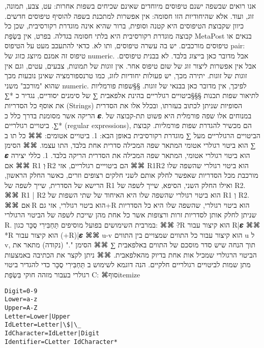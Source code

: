       אנו רואים שבשפה ישנם טיפוסים מיוחדים שאינם שכיחים בשפות אחרות: עט, צבע,
      תמונה, זוג, ועוד. אלא שהיחודיות הזו חסומה: אין אפשרות למתכנת בשפה להוסיף
      טיפוסים חדשים. כיוון שקבוצת הטיפוסים היא קטנה וסופית, ברור שהיא אינה
      מוגדרת רקורסיבית, שכן כל קבוצה מוגדרת רקורסיבית היא בלתי חסומה בגדלה.
      בפרט, אין בִּשְׂפַת MetaPost בנאים או טיפוסים מורכבים. יש בה עשרה טיפוסים, ותו
      לא. כדאי להתעכב מעט על הטיפוס pair: טיפוס זה אמנם מיוצג כזוג של numeric.
      אבל מדובר כאן בייצוג בלבד. לא בבנית טיפוסים. אבל אין אפשרות ליצור זוג של
      שום טיפוס אחר. אין זוגות של תמונות, צבעים, עטים, וגם אין זוגות של זוגות.
      יתירה מכך, יש פעולות יחודיות לזוג, כמו טרנספורמציה שאינן נובעות מכך שהוא
      "מורכב" משני numeric. לפיכך, אין מדובר כאן בבנאי של זוגות.
      §§שפות פורמליות לתיאור שפות תכנות
      §§§ביטויים רגולריים
      בהינת אלפאבית ∑ של סימנים יסודיים, נגדיר כ *∑ את אוסף כל הסדריות (Strings) הסופיות שניתן לכתוב בעזרתו, ובכלל אלו את הסדרית הריקה אשר מסומנת בדרך כלל כ 𝜺. במנוחים אלו שפה פורמלית היא פשוט תת-קבוצה של *∑. ביטויים רגולריים (regular expressions), הם מכשיר להגדרת שפות פורמליות.
      קבוצת הביטויים הרגולריים מעל ∑ מוגדרת רקורסיבית באופן הבא:
      1. ביטויים אטומים:
      ⌘⌘ כל תו ב ∑ הוא ביטוי רגולרי אטומי המתאר שפה המכילה סדרית אחת בלבד, התו עצמו.
      ⌘⌘ הסימן 𝜺 הוא ביטוי רגולרי אטומי, המתאר שפה המכילה את הסדרית הריקה בלבד.
      1. כללי יצירה
      ⌘⌘ אם R1 וְ ּR2 הם ביטוייים רגולריים, אזי
      ⌘⌘ R1R2 הוא ביטוי רגולרי שהשפה שלו מורכבת מכל הסדריות שאפשר לחלק אותם לשני חלקים רצופים וזרים, כאשר החלק הראשון, הרישא של הסדרית, שייך לשפה של R1 ואילו החלק השני, הסיפא, שייך לשפה של R2.
      ⌘⌘ R1 | R2 הוא ביטוי רגולרי שהשפה שלו היא האיחוד של שתי השפות של R1 וְ R2.
      ⌘⌘ אם ּR הוא ביטוי רגולרי, אזי גם+R הוא ביטוי רגולרי, שהשפה שלו היא כל הסדריות שניתן לחלק אותן לסדריות זרות ורצופות אשר כל אחת מהן שייכת לשפה של הביטוי הרגולרי R.
      במרבית השימושים בפועל מוסיפים תַּחְבִּירִי סֻכָּר כגון:
      ⌘⌘ ?ּR הוא קיצור עבור R|𝜺
      ⌘⌘ *R הוא קיצור עבור (+R)|𝜺
      ⌘⌘ u-v הוא קיצור עבור כל התווים שמצויים בין התווים u ל v, תוך הנחה שיש סדר מוסכם של התווים באלפאבית ∑
      ⌘⌘ הסימן "." (נקודה) מתאר את הביטוי הרגולרי שמכיל אות אחת בדיוק מהאלפאבית.
      ⌘⌘ ניתן לקצר את הכתיבה באמצעות מתן שמות לביטויים רגולריים חלקיים.
      הנה דוגמא לשימוש ב תַּחְבִּירִי סֻכָּר כדי להגדיר ביטוי רגולרי בעבור מזהה חוקי בִּשְׂפַת C:
  ⌘סוף{itemize}
\begin{verbatim}
Digit=0-9
Lower=a-z
Upper=A-Z
Letter=Lower|Upper
IdLetter=Letter|\$|\_
IdCharacter=IdLetter|Digit
Identifier=CLetter IdCharacter*
\end{verbatim}

